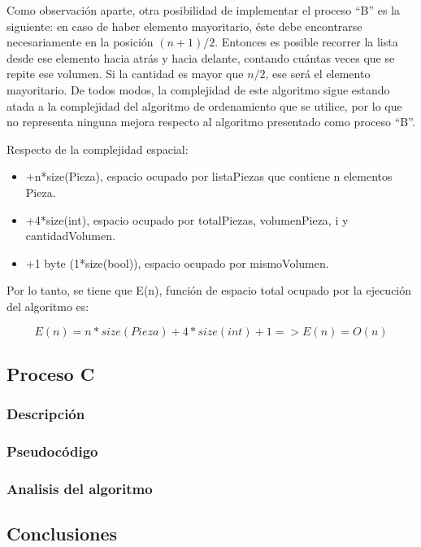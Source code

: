\documentclass{article}
\begin{document}
Como observación aparte, otra posibilidad de implementar el proceso “B” es la siguiente: en caso de haber elemento mayoritario, éste debe encontrarse necesariamente en la posición \((n+1)/2\).  Entonces es posible recorrer la lista desde ese elemento hacia atrás y hacia delante, contando cuántas veces que se repite ese volumen. 
Si la cantidad es mayor que \(n/2\), ese será el elemento mayoritario. 
De todos modos, la complejidad de este algoritmo sigue estando atada a la complejidad del algoritmo de ordenamiento que se utilice, por lo que no representa ninguna mejora respecto al algoritmo presentado como proceso “B”.


Respecto de la complejidad espacial:

\begin{itemize}
    \item +n*size(Pieza), espacio ocupado por listaPiezas que contiene n elementos Pieza.
    \item +4*size(int), espacio ocupado por totalPiezas, volumenPieza, i y cantidadVolumen.
    \item +1 byte (1*size(bool)), espacio ocupado por mismoVolumen.
\end{itemize}

Por lo tanto, se tiene que E(n), función de espacio total ocupado por la ejecución del algoritmo es:

\begin{equation}
    E(n) = n*size(Pieza) + 4*size(int) + 1 => E(n) = O(n)    
\end{equation}

\newpage
\subsection{Proceso C}
\subsubsection{Descripción}
\subsubsection{Pseudocódigo}
\subsubsection{Analisis del algoritmo}
\subsection{Conclusiones}
\end{document}
